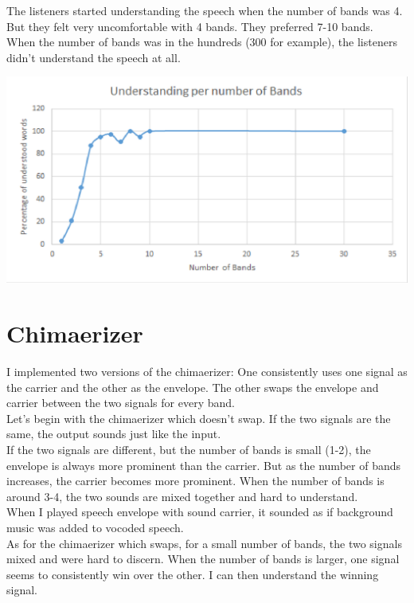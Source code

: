\documentclass[11pt]{article}
\begin{document}
The listeners started understanding the speech when the number of bands was 4.
But they felt very uncomfortable with 4 bands. They preferred 7-10 bands.\\

When the number of bands was in the hundreds (300 for example),
the listeners didn't understand the speech at all.

\includegraphics[width=\textwidth]{output/experiment.png}

\pagebreak
\section{Chimaerizer}
I implemented two versions of the chimaerizer:
One consistently uses one signal as the carrier and the other
as the envelope.
The other swaps the envelope and carrier between the two signals for 
every band.\\

Let's begin with the chimaerizer which doesn't swap.
If the two signals are the same, the output sounds just like the input.\\

If the two signals are different, but the number of bands is small (1-2),
the envelope is always more prominent than the carrier.
But as the number of bands increases, the carrier becomes more prominent.
When the number of bands is around 3-4, the two sounds are mixed together
and hard to understand.\\

When I played speech envelope with sound carrier,
it sounded as if background music was added to vocoded speech.\\

As for the chimaerizer which swaps,
for a small number of bands, the two signals mixed and were hard to discern.
When the number of bands is larger,
one signal seems to consistently win over the other.
I can then understand the winning signal.\\
\end{document}
